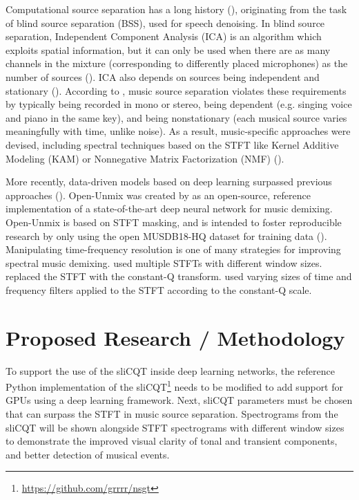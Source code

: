 \documentclass[letter,12pt]{article}
\begin{document}
Computational source separation has a long history (\cite{musicsepintro1}), originating from the task of blind source separation (BSS), used for speech denoising. In blind source separation, Independent Component Analysis (ICA) is an algorithm which exploits spatial information, but it can only be used when there are as many channels in the mixture (corresponding to differently placed microphones) as the number of sources (\cite{ica1}). ICA also depends on sources being independent and stationary (\cite{musicsepintro1}). According to \textcite{musicsepintro1}, music source separation violates these requirements by typically being recorded in mono or stereo, being dependent (e.g. singing voice and piano in the same key), and being nonstationary (each musical source varies meaningfully with time, unlike noise). As a result, music-specific approaches were devised, including spectral techniques based on the STFT like Kernel Additive Modeling (KAM) or Nonnegative Matrix Factorization (NMF) (\cite{musicsepgood}).

More recently, data-driven models based on deep learning surpassed previous approaches (\cite{sisec2018}). Open-Unmix was created by \textcite{umx} as an open-source, reference implementation of a state-of-the-art deep neural network for music demixing. Open-Unmix is based on STFT masking, and is intended to foster reproducible research by only using the open MUSDB18-HQ dataset for training data (\cite{musdb18hq}). Manipulating time-frequency resolution is one of many strategies for improving spectral music demixing. \textcite{driedger} used multiple STFTs with different window sizes. \textcite{fitzgerald2} replaced the STFT with the constant-Q transform. \textcite{plumbley2} used varying sizes of time and frequency filters applied to the STFT according to the constant-Q scale.

\section{Proposed Research / Methodology}

To support the use of the sliCQT inside deep learning networks, the reference Python implementation of the sliCQT\footnote{\url{https://github.com/grrrr/nsgt}} needs to be modified to add support for GPUs using a deep learning framework. Next, sliCQT parameters must be chosen that can surpass the STFT in music source separation. Spectrograms from the sliCQT will be shown alongside STFT spectrograms with different window sizes to demonstrate the improved visual clarity of tonal and transient components, and better detection of musical events.
\end{document}
